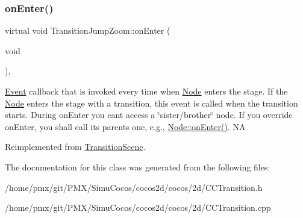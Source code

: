 \subsubsection{\texorpdfstring{on\+Enter()}{onEnter()}\hspace{0.1cm}{\footnotesize\ttfamily [2/2]}}
{\footnotesize\ttfamily virtual void Transition\+Jump\+Zoom\+::on\+Enter (\begin{DoxyParamCaption}\item[{void}]{ }\end{DoxyParamCaption})\hspace{0.3cm}{\ttfamily [override]}, {\ttfamily [virtual]}}

\hyperlink{classEvent}{Event} callback that is invoked every time when \hyperlink{classNode}{Node} enters the \textquotesingle{}stage\textquotesingle{}. If the \hyperlink{classNode}{Node} enters the \textquotesingle{}stage\textquotesingle{} with a transition, this event is called when the transition starts. During on\+Enter you can\textquotesingle{}t access a \char`\"{}sister/brother\char`\"{} node. If you override on\+Enter, you shall call its parent\textquotesingle{}s one, e.\+g., \hyperlink{classNode_a7f51764c4afd5018a052b9ef71c03374}{Node\+::on\+Enter()}.  NA 

Reimplemented from \hyperlink{classTransitionScene_aace390a1bd8f3c73bb650a1e256a0f83}{Transition\+Scene}.



The documentation for this class was generated from the following files\+:\begin{DoxyCompactItemize}
\item 
/home/pmx/git/\+P\+M\+X/\+Simu\+Cocos/cocos2d/cocos/2d/C\+C\+Transition.\+h\item 
/home/pmx/git/\+P\+M\+X/\+Simu\+Cocos/cocos2d/cocos/2d/C\+C\+Transition.\+cpp\end{DoxyCompactItemize}
